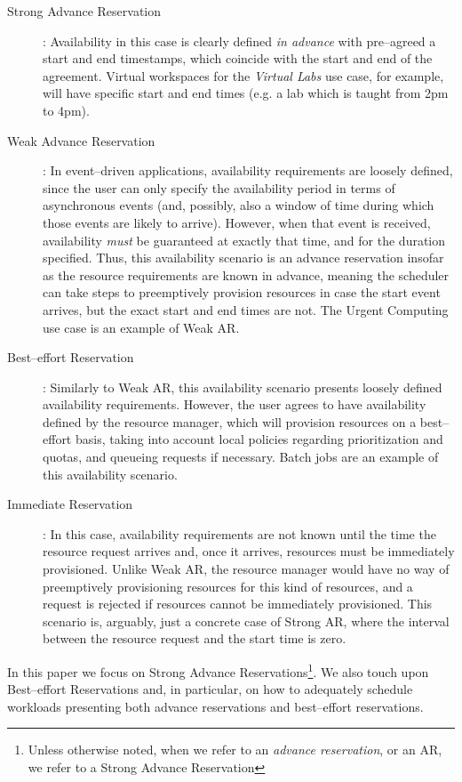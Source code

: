 \documentclass[singlespace]{ccw_chithesis}
\begin{document}
\begin{description}
\item[Strong Advance Reservation]: Availability in this case is clearly defined \emph{in advance} with pre--agreed a start and end timestamps, which coincide with the start and end of the agreement. Virtual workspaces for the \emph{Virtual Labs} use case, for example, will have specific start and end times (e.g. a lab which is taught from 2pm to 4pm).
\item[Weak Advance Reservation]: In event--driven applications, availability requirements are loosely defined, since the user can only specify the availability period in terms of asynchronous events (and, possibly, also a window of time during which those events are likely to arrive). However, when that event is received, availability \emph{must} be guaranteed at exactly that time, and for the duration specified. Thus, this availability scenario is an advance reservation insofar as the resource requirements are known in advance, meaning the scheduler can take steps to preemptively provision resources in case the start event arrives, but the exact start and end times are not. The Urgent Computing use case is an example of Weak AR.
\item[Best--effort Reservation]: Similarly to Weak AR, this availability scenario presents loosely defined availability requirements. However, the user agrees to have availability defined by the resource manager, which will provision resources on a best--effort basis, taking into account local policies regarding prioritization and quotas, and queueing requests if necessary. Batch jobs are an example of this availability scenario.  
\item[Immediate Reservation]: In this case, availability requirements are not known until the time the resource request arrives and, once it arrives, resources must be immediately provisioned. Unlike Weak AR, the resource manager would have no way of preemptively provisioning resources for this kind of resources, and a request is rejected if resources cannot be immediately provisioned. This scenario is, arguably, just a concrete case of Strong AR, where the interval between the resource request and the start time is zero.
\end{description}

In this paper we focus on Strong Advance Reservations\footnote{Unless otherwise noted, when we refer to an \emph{advance reservation}, or an AR, we refer to a Strong Advance Reservation}. We also touch upon Best--effort Reservations and, in particular, on how to adequately schedule workloads presenting both advance reservations and best--effort reservations.
\end{document}
